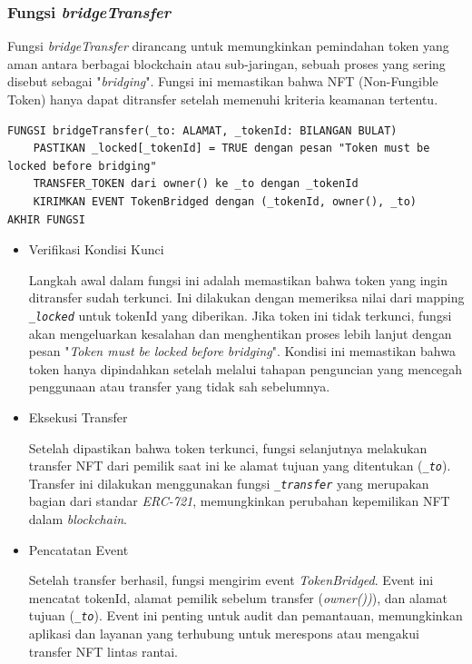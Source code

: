 \subsubsection{Fungsi \emph{bridgeTransfer}}
Fungsi \emph{bridgeTransfer} dirancang untuk memungkinkan pemindahan token yang aman antara berbagai blockchain atau sub-jaringan, sebuah proses yang sering disebut sebagai "\emph{bridging}". Fungsi ini memastikan bahwa NFT (Non-Fungible Token) hanya dapat ditransfer setelah memenuhi kriteria keamanan tertentu.

\begin{lstlisting}[caption=Fungsi bridgeTransfer]
FUNGSI bridgeTransfer(_to: ALAMAT, _tokenId: BILANGAN BULAT)
    PASTIKAN _locked[_tokenId] = TRUE dengan pesan "Token must be locked before bridging"
    TRANSFER_TOKEN dari owner() ke _to dengan _tokenId
    KIRIMKAN EVENT TokenBridged dengan (_tokenId, owner(), _to)
AKHIR FUNGSI
\end{lstlisting}

\begin{itemize}
    \item Verifikasi Kondisi Kunci
    
    Langkah awal dalam fungsi ini adalah memastikan bahwa token yang ingin ditransfer sudah terkunci. Ini dilakukan dengan memeriksa nilai dari mapping \emph{\texttt{\_locked}} untuk tokenId yang diberikan. Jika token ini tidak terkunci, fungsi akan mengeluarkan kesalahan dan menghentikan proses lebih lanjut dengan pesan "\emph{Token must be locked before bridging}". Kondisi ini memastikan bahwa token hanya dipindahkan setelah melalui tahapan penguncian yang mencegah penggunaan atau transfer yang tidak sah sebelumnya.

    \item Eksekusi Transfer
    
    Setelah dipastikan bahwa token terkunci, fungsi selanjutnya melakukan transfer NFT dari pemilik saat ini ke alamat tujuan yang ditentukan (\emph{\texttt{\_to}}). Transfer ini dilakukan menggunakan fungsi \emph{\texttt{\_transfer}} yang merupakan bagian dari standar \emph{ERC-721}, memungkinkan perubahan kepemilikan NFT dalam \emph{blockchain}.

    \item Pencatatan Event
    
    Setelah transfer berhasil, fungsi mengirim event \emph{TokenBridged}. Event ini mencatat tokenId, alamat pemilik sebelum transfer (\emph{owner())}), dan alamat tujuan (\emph{\texttt{\_to}}). Event ini penting untuk audit dan pemantauan, memungkinkan aplikasi dan layanan yang terhubung untuk merespons atau mengakui transfer NFT lintas rantai.
\end{itemize}

